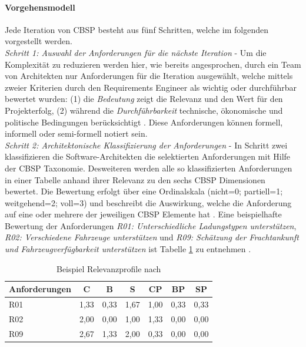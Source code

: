 \paragraph{Vorgehensmodell} 
Jede Iteration von CBSP besteht aus f\"unf Schritten, welche im folgenden vorgestellt werden. \\

\emph{Schritt 1: Auswahl der Anforderungen f\"ur die n\"achste Iteration} - 
Um die Komplexit\"at zu reduzieren werden hier, wie bereits angesprochen, durch ein Team von Architekten nur Anforderungen f\"ur die Iteration ausgew\"ahlt, welche mittels zweier Kriterien durch den Requirements Engineer als wichtig oder durchf\"uhrbar bewertet wurden: (1) die \textit{Bedeutung} zeigt die Relevanz und den Wert f\"ur den Projekterfolg, (2) w\"ahrend die \textit{Durchf\"uhrbarkeit} technische, \"okonomische und politische Bedingungen ber\"ucksichtigt \cite{Gru01}. Diese Anforderungen k\"onnen formell, informell oder semi-formell notiert sein. \\

\emph{Schritt 2: Architektonische Klassifizierung der Anforderungen} - 
In Schritt zwei klassifizieren die Software-Architekten die selektierten Anforderungen mit Hilfe der CBSP Taxonomie. Desweiteren werden alle so klassifizierten Anforderungen in einer Tabelle anhand ihrer Relevanz zu den sechs CBSP Dimensionen bewertet. Die Bewertung erfolgt \"uber eine Ordinalskala (nicht=0; partiell=1; weitgehend=2; voll=3) und beschreibt die Auswirkung, welche die Anforderung auf eine oder mehrere der jeweiligen CBSP Elemente hat \cite{Gru01}. Eine beispielhafte Bewertung der Anforderungen \textit{R01: Unterschiedliche Ladungstypen unterst\"utzen}, \textit{R02: Verschiedene Fahrzeuge unterst\"utzen} und \textit{R09: Sch\"atzung der Frachtankunft und Fahrzeugverf\"ugbarkeit unterst\"utzen} ist Tabelle \ref{tab:relevance_profiles} zu entnehmen \cite{Gru01}. 

\begin{table}[h] %
\caption{Beispiel Relevanzprofile nach \cite{Gru01}}
\centering
\begin{tabular}{|l|c|c|c|c|c|c|}
\hline 
\textbf{Anforderungen} & \textbf{C} & \textbf{B} & \textbf{S} & \textbf{CP} & \textbf{BP} & \textbf{SP} \\ 
\hline 
R01 & 1,33 & 0,33 & \cellcolor{Gray} 1,67 & 1,00 & 0,33 & 0,33 \\ 
\hline 
R02 & \cellcolor{Gray} 2,00 & 0,00 & 1,00 & 1,33 & 0,00 & 0,00 \\ 
\hline 
R09 & \cellcolor{Gray} 2,67 & 1,33 & 2,00 & 0,33 & 0,00 & 0,00 \\ 
\hline 
\end{tabular} 
\label{tab:relevance_profiles}
\end{table}

